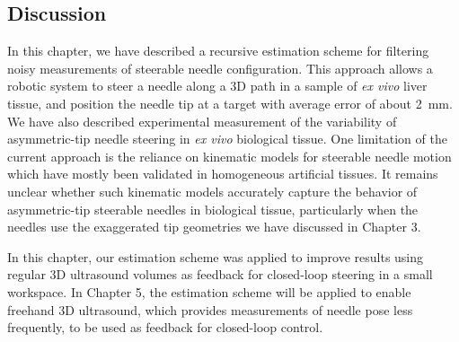 \subsection{Discussion}
\label{sec:UKFDiscussion}
In this chapter, we have described a recursive estimation scheme for filtering noisy measurements of steerable needle configuration. This approach allows a robotic system to steer a needle along a 3D path in a sample of \textit{ex vivo} liver tissue, and position the needle tip at a target with average error of about 2~mm. We have also described experimental measurement of the variability of asymmetric-tip needle steering in \textit{ex vivo} biological tissue. One limitation of the current approach is the reliance on kinematic models for steerable needle motion which have mostly been validated in homogeneous artificial tissues. It remains unclear whether such kinematic models accurately capture the behavior of asymmetric-tip steerable needles in biological tissue, particularly when the needles use the exaggerated tip geometries we have discussed in Chapter 3. 

In this chapter, our estimation scheme was applied to improve results using regular 3D ultrasound volumes as feedback for closed-loop steering in a small workspace. In Chapter 5, the estimation scheme will be applied to enable freehand 3D ultrasound, which provides measurements of needle pose less frequently, to be used as feedback for closed-loop control. 

